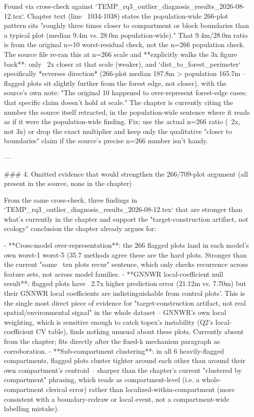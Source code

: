 Found via cross-check against `TEMP_rq3_outlier_diagnosis_results_2026-08-12.tex`. Chapter text
(line ~1034-1038) states the population-wide 266-plot pattern sits "roughly three times closer
to compartment or block boundaries than a typical plot (median 9.4m vs. 28.0m population-wide)."
That 9.4m/28.0m ratio is from the original n=10 worst-residual check, not the n=266 population
check. The source file re-ran this at n=266 scale and **explicitly walks the 3x figure back**:
only ~2x closer at that scale (weaker), and `dist_to_forest_perimeter` specifically *reverses
direction* (266-plot median 187.8m > population 165.7m -- flagged plots sit slightly further
from the forest edge, not closer), with the source's own note: "The original 10 happened to
over-represent forest-edge cases; that specific claim doesn't hold at scale." The chapter is
currently citing the number the source itself retracted, in the population-wide sentence where
it reads as if it were the population-wide finding. Fix: use the actual n=266 ratio (~2x, not
3x) or drop the exact multiplier and keep only the qualitative "closer to boundaries" claim if
the source's precise n=266 number isn't handy.

---

### 4. Omitted evidence that would strengthen the 266/709-plot argument (all present in the source, none in the chapter)

From the same cross-check, three findings in `TEMP_rq3_outlier_diagnosis_results_2026-08-12.tex`
that are stronger than what's currently in the chapter and support the "target-construction
artifact, not ecology" conclusion the chapter already argues for:

- **Cross-model over-representation**: the 266 flagged plots land in each model's own worst-1%
  worst-5%
  (35.7%
  methods agree these are the hard plots. Stronger than the current "same ~ten plots recur"
  sentence, which only checks recurrence across feature sets, not across model families.
- **GNNWR local-coefficient null result**: flagged plots have ~2.7x higher prediction error
  (21.12m vs. 7.70m) but their GNNWR local coefficients are indistinguishable from control
  plots'. This is the single most direct piece of evidence for "target-construction artifact,
  not real spatial/environmental signal" in the whole dataset -- GNNWR's own local weighting,
  which is sensitive enough to catch topex's instability (Q2's local-coefficient CV table),
  finds nothing unusual about these plots. Currently absent from the chapter; fits directly
  after the fixed-k mechanism paragraph as corroboration.
- **Sub-compartment clustering**: in all 6 heavily-flagged compartments, flagged plots cluster
  tighter around each other than around their own compartment's centroid -- sharper than the
  chapter's current "clustered by compartment" phrasing, which reads as compartment-level
  (i.e. a whole-compartment clerical error) rather than localized-within-compartment (more
  consistent with a boundary-redraw or local event, not a compartment-wide labelling mistake).

